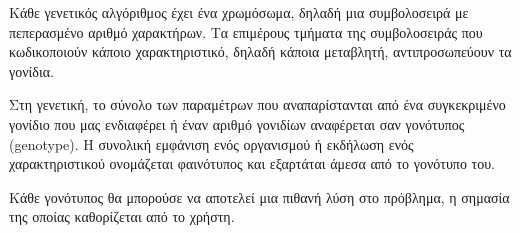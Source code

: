 Κάθε γενετικός αλγόριθμος έχει ένα χρωμόσωμα, δηλαδή μια συμβολοσειρά με πεπερασμένο αριθμό χαρακτήρων. Τα επιμέρους τμήματα της συμβολοσειράς που κωδικοποιούν κάποιο χαρακτηριστικό, δηλαδή κάποια μεταβλητή, αντιπροσωπεύουν τα γονίδια.

Στη γενετική, το σύνολο των παραμέτρων που αναπαρίστανται από ένα συγκεκριμένο γονίδιο που μας ενδιαφέρει ή έναν αριθμό γονιδίων αναφέρεται σαν γονότυπος (genotype). Η συνολική εμφάνιση ενός οργανισμού ή εκδήλωση ενός χαρακτηριστικού ονομάζεται φαινότυπος και εξαρτάται άμεσα από το γονότυπο του.

Κάθε γονότυπος θα μπορούσε να αποτελεί μια πιθανή λύση στο πρόβλημα, η σημασία της οποίας καθορίζεται από το χρήστη. 